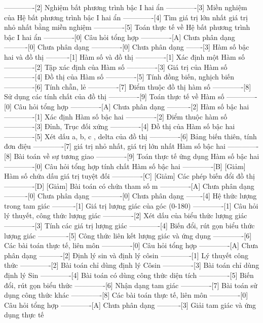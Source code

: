 -------------[2] Nghiệm bất phương trình bậc I hai ẩn
-------------[3] Miền nghiệm của Hệ bất phương trình bậc I hai ẩn
-------------[4] Tìm giá trị lớn nhất giá trị nhỏ nhất bằng miền nghiệm
-------------[5] Toán thực tế về Hệ bất phương trình bậc I hai ẩn
-------------[0] Câu hỏi tổng hợp
-------------[A] Chưa phân dạng
----------[0] Chưa phân dạng
-------------[0] Chưa phân dạng
-------[3] Hàm số bậc hai và đồ thị
----------[1] Hàm số và đồ thị
-------------[1] Xác định một Hàm số
-------------[2] Tập xác định của Hàm số
-------------[3] Giá trị của Hàm số
-------------[4] Đồ thị của Hàm số
-------------[5] Tính đồng biến, nghịch biến
-------------[6] Tính chẵn, lẻ
-------------[7] Điểm thuộc đồ thị hàm số
-------------[8] Sử dụng các tính chất của đồ thị
-------------[9] Toán thực tế về Hàm số
-------------[0] Câu hỏi tổng hợp
-------------[A] Chưa phân dạng
----------[2] Hàm số bậc hai
-------------[1] Xác định Hàm số bậc hai
-------------[2] Điểm thuộc hàm số
-------------[3] Đỉnh, Trục đối xứng
-------------[4] Đồ thị của Hàm số bậc hai
-------------[5] Xét dấu a, b, c , delta của đồ thị
-------------[6] Bảng biến thiên, tính đơn điệu
-------------[7] giá trị nhỏ nhất, giá trị lớn nhất Hàm số bậc hai
-------------[8] Bài toán về sự tương giao
-------------[9] Toán thực tế ứng dụng Hàm số bậc hai
-------------[0] Câu hỏi tổng hợp tính chất Hàm số bậc hai
-------------[B] [Giảm] Hàm số chứa dấu giá trị tuyệt đối
-------------[C] [Giảm] Các phép biến đổi đồ thị 
-------------[D] [Giảm] Bài toán có chứa tham số m
-------------[A] Chưa phân dạng
----------[0] Chưa phân dạng
-------------[0] Chưa phân dạng
-------[4] Hệ thức lượng trong tam giác
----------[1] Giá trị lượng giác của góc (0-180)
-------------[1] Câu hỏi lý thuyết, công thức lượng giác
-------------[2] Xét dấu của biểu thức lượng giác
-------------[3] Tính các giá trị lượng giác
-------------[4] Biến đổi, rút gọn biểu thức lượng giác
-------------[5] Công thức liên kết lượng giác và ứng dụng
-------------[6] Các bài toán thực tế, liên môn
-------------[0] Câu hỏi tổng hợp
-------------[A] Chưa phân dạng
----------[2] Định lý sin và định lý côsin
-------------[1] Lý thuyết công thức
-------------[2] Bài toán chỉ dùng định lý Côsin
-------------[3] Bài toán chỉ dùng định lý Sin 
-------------[4] Bài toán có dùng công thức diện tích
-------------[5] Biến đổi, rút gọn biểu thức
-------------[6] Nhận dạng tam giác
-------------[7] Bài toán sử dụng công thức khác
-------------[8] Các bài toán thực tế, liên môn
-------------[0] Câu hỏi tổng hợp
-------------[A] Chưa phân dạng
----------[3] Giải tam giác và ứng dụng thực tế

